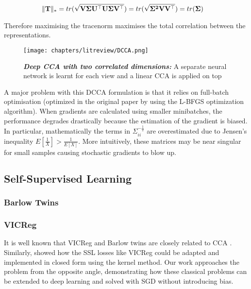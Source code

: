 \begin{align}
    & \|\bold{T}\|_*=tr(\sqrt{\bold{V\Sigma U^{\top}U\Sigma V^{\top}}})=tr(\sqrt{\bold{\Sigma^2 VV^{\top}}})=tr(\bold{\Sigma})
\end{align}

Therefore maximising the tracenorm maximises the total correlation between the representations.

\begin{figure}[H] %
    \centering %
    \texttt{[image: chapters/litreview/DCCA.png]} 
    \caption[Deep CCA Representation]{\textit{\textbf{Deep CCA with two correlated dimensions:}} A separate neural network is learnt for each view and a linear CCA is applied on top \cite{andrew2013deep}}
    \label{img:DCCA}
\end{figure}

A major problem with this DCCA formulation is that it relies on full-batch optimisation (optimized in the original paper by using the L-BFGS optimization algorithm). When gradients are calculated using smaller minibatches, the performance degrades drastically  because the estimation of the gradient is biased. In particular, mathematically the terms in $\Sigma_{ii}^{-\frac{1}{2}}$ are overestimated due to Jensen's inequality $E[\frac{1}{X}]>\frac{1}{E[X]}$. More intuitively, these matrices may be near singular for small samples causing stochastic gradients to blow up.

\subsection{Self-Supervised Learning}
\subsubsection{Barlow Twins}

\subsubsection{VICReg}


It is well known that VICReg and Barlow twins are closely related to CCA \cite{balestriero2022contrastive}. Similarly, \cite{kiani2022joint} showed how the SSL losses like VICReg could be adapted and implemented in closed form using the kernel method. Our work approaches the problem from the opposite angle, demonstrating how these classical problems can be extended to deep learning and solved with SGD without introducing bias.

